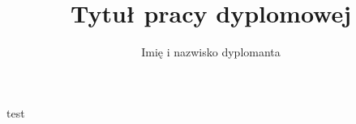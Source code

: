 \documentclass[12pt,a4paper,polish,engineering]{wizthesis}
\author{Imię i nazwisko dyplomanta}
\title{Tytuł pracy dyplomowej}
\begin{document}
\frontmatter
\maketitle
\mainmatter

test
\end{document}
